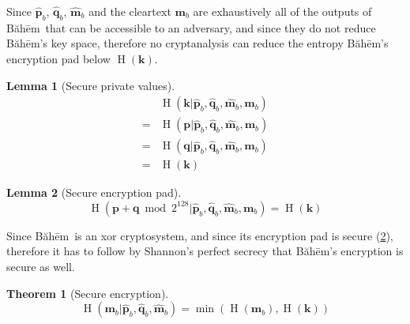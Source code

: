 \documentclass[twocolumn,hidelinks]{article}
\newcommand{\baheem}{Băhēm}
\DeclareMathOperator{\entropy}{H}
\newtheorem{lemma}{Lemma}
\newtheorem{theorem}{Theorem}
\begin{document}
Since $\mathbf{\hat p}_b$, $\mathbf{\hat q}_b$, $\mathbf{\hat m}_b$ and the
cleartext $\mathbf{m}_b$ are exhaustively all of the outputs of \baheem\
that can be accessible to an adversary, and since they do not reduce
\baheem's key space, therefore no cryptanalysis can reduce the entropy
\baheem's encryption pad below $\entropy(\mathbf{k})$.

\begin{lemma}[Secure private values]
    \[\begin{split}
        &\entropy(
            \mathbf{k}
            | \mathbf{\hat p}_b,
              \mathbf{\hat q}_b,
              \mathbf{\hat m}_b,
              \mathbf{m}_b
        ) \\
        =&\entropy(
            \mathbf{p}
            | \mathbf{\hat p}_b,
              \mathbf{\hat q}_b,
              \mathbf{\hat m}_b,
              \mathbf{m}_b
        ) \\
        =&\entropy(
            \mathbf{q}
            | \mathbf{\hat p}_b,
              \mathbf{\hat q}_b,
              \mathbf{\hat m}_b,
              \mathbf{m}_b
        ) \\
        =&\entropy(\mathbf{k})
    \end{split}\]
    \label{thrm_baheem_secure_private_values}
\end{lemma}

\begin{lemma}[Secure encryption pad]
    \[
        \entropy(
            \mathbf{p} + \mathbf{q} \bmod{2^{128}}
            | \mathbf{\hat p}_b,
              \mathbf{\hat q}_b,
              \mathbf{\hat m}_b,
              \mathbf{m}_b
        )
        = \entropy(\mathbf{k})
    \]
    \label{thrm_baheem_secure_encryption_pad}
\end{lemma}

Since \baheem\ is an \gls{xor} cryptosystem, and since its encryption pad
is secure (\cref{thrm_baheem_secure_encryption_pad}), therefore it has to
follow by Shannon's perfect secrecy \cite{perfect_secrecy} that \baheem's
encryption is secure as well.

\begin{theorem}[Secure encryption]
    \[
        \entropy(
            \mathbf{m}_b
            | \mathbf{\hat p}_b,
              \mathbf{\hat q}_b,
              \mathbf{\hat m}_b
        )
        = \min(\entropy(\mathbf{m}_b), \entropy(\mathbf{k}))
    \]
    \label{thrm_baheem_secure}
\end{theorem}
\end{document}
